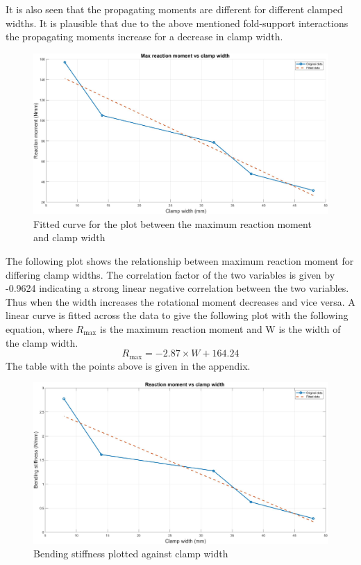 It is also seen that the propagating moments are different for different clamped widths. It is plausible that due to the above mentioned fold-support interactions the propagating moments increase for a decrease in clamp width. 
\begin{figure}[!hbt]
    \centering
    \includegraphics[width=15cm]{images/maxRM.jpg}
    \caption{Fitted curve for the plot between the maximum reaction moment and clamp width}
    \label{fig:maxRM}
\end{figure}
The following plot shows the relationship between maximum reaction moment for differing clamp widths. The correlation factor of the two variables is given by -0.9624 indicating a strong linear negative correlation between the two variables. Thus when the width increases the rotational moment decreases and vice versa. A linear curve is fitted across the data to give the following plot with the following equation, where $R_{\mathrm{max}}$ is the maximum reaction moment and W is the width of the clamp width.   
 \begin{equation}
     R_{\mathrm{max}}=-2.87\times W+ 164.24
     \label{eq:maxRM}
 \end{equation}
The table with the points above is given in the appendix. 
\begin{figure}[!hbt]
    \centering
    \includegraphics[width=15cm]{images/bend_stiffness.jpg}
    \caption{Bending stiffness plotted against clamp width}
    \label{fig:bendstiff}
\end{figure}
